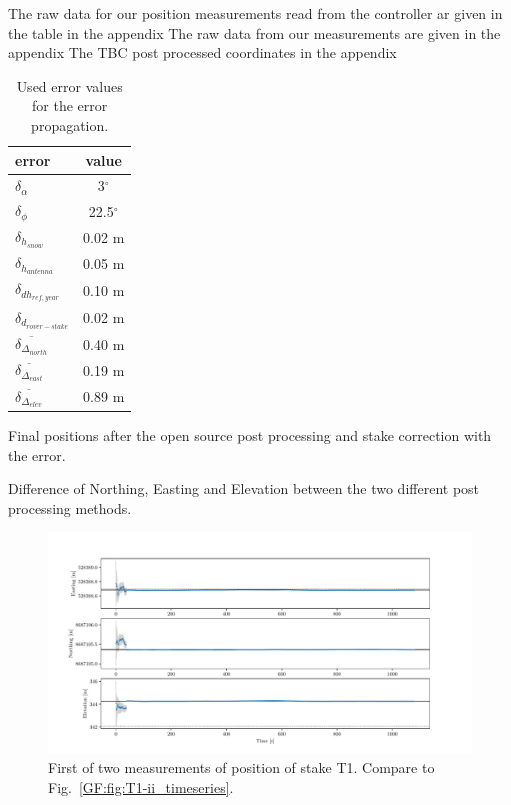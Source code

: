 The raw data for our position measurements read from the controller ar given in the table in the appendix 
The raw data from our measurements are given in the appendix
The TBC post processed coordinates in the appendix 

\begin{table}[h]
	\caption{Used error values for the error propagation.}
	\centering
	\begin{tabular}{lc}
	\toprule
        error &  value \\
	\midrule
    $ \delta_{\alpha} $ &  3$^{\circ}$ \\
    $ \delta_{\phi} $ &  22.5$^{\circ}$ \\
    $ \delta_{h_{snow}}$ &  0.02 m \\
    $ \delta_{h_{antenna}} $ &  0.05 m \\
    $ \delta_{dh_{ref,year}} $ &  0.10 m \\
    $ \delta_{d_{rover-stake}} $ &  0.02 m \\
    $ \overline{\delta_{\Delta_{north}}} $ & 0.40 m \\
    $ \overline{\delta_{\Delta_{east}}} $ & 0.19 m \\
    $ \overline{\delta_{\Delta_{elev}}} $ & 0.89 m \\
    \bottomrule
\end{tabular}
	\label{GPS:tab:err}
\end{table}

\begin{table}[h]
	\caption{Final positions after the open source post processing and stake correction with the error.}
	\centering
	\scriptsize
	
	\label{GPS:tab:os_tab}
\end{table}


\begin{table}[h]
	\caption{Difference of Northing, Easting and Elevation between the two different post processing methods.}
	\centering
	
	\label{GPS:tab:diff_tab}
\end{table}

\begin{figure}[H]
    \centering
    \includegraphics[width=\textwidth]{./figs/timeseries/46250700_corr-T1-i-2017_Timeseries-east-north-elev.pdf}
    \caption{First of two measurements of position of stake T1. Compare to Fig.~\ref{GF:fig:T1-ii_timeseries}.}
    \label{GF:fig:T1-i_timeseries}
\end{figure}


